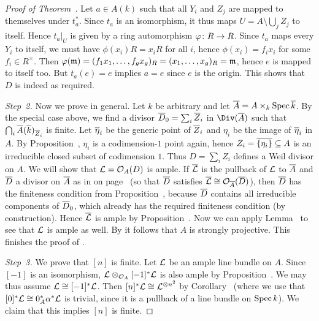 \documentclass[a4paper,parskip=half,numbers=enddot, DIV=12]{scrreprt}
\begin{document}
\begin{proof}[Proof of Theorem~]
	Let $a\in A(k)$ such that all $Y_i$ and $Z_j$ are mapped to themselves under $t_a^*$. Since $t_a$ is an isomorphism, it thus maps $U=A\setminus \bigcup_jZ_j$ to itself. Hence $t_a|_U$ is given by a ring automorphism $\phi\colon R\morphism R$. Since $t_a$ maps every $Y_i$ to itself, we must have $\phi(x_i)R=x_iR$ for all $i$, hence $\phi(x_i)=f_ix_i$ for some $f_i\in R^\times$. Then $\varphi(\mathfrak{m})=(f_1x_1,\ldots,f_gx_g)_R=(x_1,\ldots,x_g)_R=\mathfrak{m}$, hence $e$ is mapped to itself too. But $t_a(e)=e$ implies $a=e$ since $e$ is the origin. This shows that $D$ is indeed as required.
	
	\emph{Step~2.} Now we prove  in general. Let $k$ be arbitrary and let $\overline{A}=A\times_k\operatorname{Spec} \overline{k}$. By the special case above, we find a divisor $\overline{D}_0=\sum_i\overline{Z}_i$ in $\Div(\ov{A})$ such that $\bigcap_i\overline{A}(\overline{k})_{\overline{Z}_i}$ is finite. Let $\overline{\eta}_i$ be the generic point of $\overline{Z}_i$ and $\eta_i$ be the image of $\overline{\eta}_i$ in $A$. By Proposition~, $\eta_i$ is a codimension-$1$ point again, hence $Z_i=\overline{\{\eta_i\}}\subseteq A$ is an irreducible closed subset of codimension $1$. Thus $D=\sum_iZ_i$ defines a Weil divisor on $A$. We will show that $\mathcal{L}=\mathcal{O}_A(D)$ is ample. If $\overline{\mathcal{L}}$ is the pullback of $\mathcal{L}$ to $\overline{A}$ and $\overline{D}$ a divisor on $\overline{A}$ as in  on page~\pageref{par:divisorPullback} (so that $\overline{D}$ satisfies $\overline{\mathcal{L}}\cong\mathcal{O}_{\overline{A}}(\overline{D})$), then $\overline{D}$ has the finiteness condition from Proposition~, because $\overline{D}$ contains all irreducible components of $\overline{D}_0$, which already has the required finiteness condition (by construction). Hence $\overline{\mathcal{L}}$ is ample by Proposition~. Now we can apply Lemma~ to see that $\mathcal{L}$ is ample as well. By \cite[Theorem~6]{alggeo2} it follows that $A$ is strongly projective. This finishes the proof of .
	
	\emph{Step~3.} We prove that $[n]$ is finite. Let $\mathcal{L}$ be an ample line bundle on $A$. Since $[-1]$ is an isomorphism, $\mathcal{L}\otimes_{\mathcal{O}_A}[-1]^*\mathcal{L}$ is also ample by Proposition~. We may thus assume $\mathcal{L}\cong [-1]^*\mathcal{L}$. Then $[n]^*\mathcal{L}\cong \mathcal{L}^{\otimes n^2}$ by Corollary~ (where we use that $[0]^*\mathcal{L}\cong 0_A^*\alpha^*\mathcal{L}$ is trivial, since it is a pullback of a line bundle on $\operatorname{Spec} k$). We claim that this implies $[n]$ is finite. 
	

\end{proof}
\end{document}
